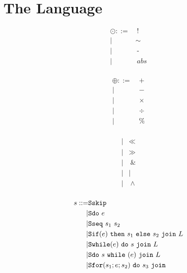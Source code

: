 \documentclass[acmsmall,review,anonymous]{acmart}\settopmatter{printfolios=true,printccs=false,printacmref=false}
\begin{document}
\section{The Language}

\begin{figure}
  \begin{subfigure}[t]{0.3\textwidth}
    \begin{minipage}[t]{0.4\textwidth}
      \[\begin{aligned}
      \odot ::= & ~ ! \\
      | & \sim \\
      | & ~ \text{-} \\
      | & ~ \mathit{abs} \\
      \end{aligned}\]
    \end{minipage}
    \begin{minipage}[t]{0.3\textwidth}
      \[\begin{aligned}
      \oplus ::= & ~ + \\
      | & ~ - \\
      | & ~ \times \\
      | & ~ \div \\
      | & ~ \% \\
      \end{aligned}\]
    \end{minipage}
    \begin{minipage}[t]{0.25\textwidth}
      \[\begin{aligned}
      | & \ll \\
      | & \gg \\
      | & ~ \& \\
      | & \mid \\
      | & ~ \wedge \\
      \end{aligned}\]
    \end{minipage}
    \[\begin{aligned}
    \stmt ::= & \sskip \\
    | & \sdo{\expr} \\
    | & \sseq{\stmt_1}{\stmt_2} \\
    | & \sifthenelse{\expr}{\stmt_1}{\stmt_2}{L} \\
    | & \swhile{\expr}{\stmt}{L} \\
    | & \sdowhile{\expr}{\stmt}{L} \\
    | & \sfor{\stmt_1}{\expr}{\stmt_2}{\stmt_3} \\

\end{aligned}\]
\end{subfigure}
\end{figure}
\end{document}

